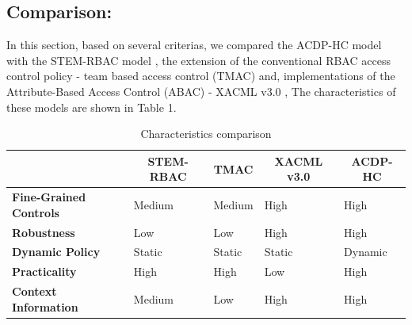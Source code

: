 \documentclass[conference]{IEEEtran}
\begin{document}
\subsection{Comparison: }

In this section, based on several criterias, we compared the ACDP-HC model with the STEM-RBAC model \cite{georgakakis2011spatio}, the extension of the conventional RBAC access control policy - team based access control (TMAC) \cite{georgiadis2001flexible} %
and, implementations of the Attribute-Based Access Control (ABAC) - XACML v3.0 \cite{rissanen2013extensible}, %
The characteristics of these models are shown in Table 1.

\begin{table}[]
\centering
\caption{Characteristics comparison}
\label{comparision}
\begin{tabular}{|l|l|l|l|l|}
\hline
                                      & \multicolumn{1}{c|}{\textbf{STEM-RBAC}} & \multicolumn{1}{c|}{\textbf{TMAC}} & \multicolumn{1}{c|}{\textbf{XACML v3.0}} & \multicolumn{1}{c|}{\textbf{ACDP-HC}} \\ \hline
\textbf{Fine-Grained Controls} & Medium                                  & Medium                             & High                                     & High                                \\ \hline
\textbf{Robustness}                   & Low                                     & Low                                & High                                     & High                                \\ \hline
\textbf{Dynamic Policy}               & Static                                  & Static                             & Static                                   & Dynamic                             \\ \hline
\textbf{Practicality}                 & High                                    & High                               & Low                                      & High                                \\ \hline
\textbf{Context Information}          & Medium                                  & Low                                & High                                     & High                                \\ \hline
\end{tabular}
\end{table}
\end{document}
